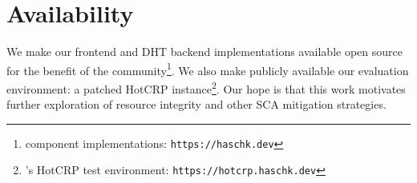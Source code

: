 \section{Availability} \label{sec:availability}

We make our \SYSTEM{} frontend and DHT backend implementations available open
source for the benefit of the community\footnote{\SYSTEM{} component
implementations: \texttt{https://haschk.dev}}. We also make publicly available
our evaluation environment: a patched HotCRP instance\footnote{\SYSTEM{}'s
HotCRP test environment: \texttt{https://hotcrp.haschk.dev}}. Our hope is that
this work motivates further exploration of resource integrity and other SCA
mitigation strategies.
